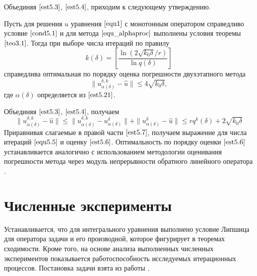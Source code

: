 Объединяя $\eqref{est5.3}$, $\eqref{est5.4}$, приходим к следующему утверждению.
\begin{theorem}\label{teo5.1}
	Пусть для решения $\hat{u}$ уравнения $\eqref{equ1}$ с монотонным оператором справедливо условие $\eqref{cond5.1}$ и для метода $\eqref{equ_alphaproc}$ выполнены условия теоремы $\ref{teo3.1}$. Тогда при выборе числа итераций по правилу
	\begin{equation}\label{equ5.5}
	k(\delta)=\left[\frac{\ln(2\sqrt{k_0\delta}/r)}{\ln q(\delta)}\right]
	\end{equation}
	справедлива оптимальная по порядку оценка погрешности двухэтапного метода
	\begin{equation}\label{est5.6}
	\|u_{\alpha(\delta)}^{\delta, k}-\hat{u}\|\le 4\sqrt{k_0 \delta},
	\end{equation}
	где $\alpha(\delta)$ определяется из $\eqref{est5.21}$.
\end{theorem}
\proof Объединяя $\eqref{est5.3}$, $\eqref{est5.4}$, получаем
\begin{equation}\label{est5.7}
\|u_{\alpha(\delta)}^{\delta, k}-\hat{u}\|\le\|u_{\alpha(\delta)}^{\delta, k}-u_{\alpha(\delta)}^{\delta}\|+\|u_{\alpha(\delta)}^{\delta}-\hat{u}\|\le rq^k(\delta)+ 2\sqrt{k_0\delta}
\end{equation}
Приравнивая слагаемые в правой части $\eqref{est5.7}$, получаем выражение для числа итераций $\eqref{equ5.5}$ и оценку $\eqref{est5.6}$. Оптимальность по порядку оценки $\eqref{est5.6}$ устанавливается аналогично \cite{Vasin2015} с использованием методологии оценивания погрешности метода через модуль непрерывности обратного линейного оператора \cite{Ivanov1974, IvaVasTan2002}.

\newpage
\section{Численные эксперименты}

Устанавливается, что для интегрального уравнения выполнено условие Липшица для оператора задачи и его производной, которое фигурирует в теоремах сходимости. Кроме того, на основе анализа выполненных численных экспериментов показывается работоспособность исследуемых итерационных процессов. Постановка задачи взята из работы \cite{Tau2002}.

